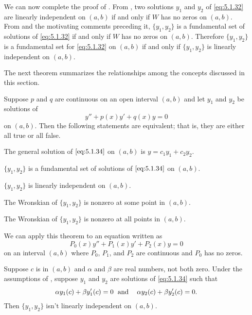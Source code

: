 We can now complete the proof of .
From , two solutions $y_1$ and $y_2$ of
\eqref{eq:5.1.32} are linearly
independent on  $(a,b)$ if and only if $W$ has no zeros on  $(a,b)$.
From  and the motivating comments preceding
it,  $\{y_1,y_2\}$ is  a fundamental set of solutions of
\eqref{eq:5.1.32}  if and only if $W$ has no zeros on  $(a,b)$.
Therefore  $\{y_1,y_2\}$ is   a fundamental set
for \eqref{eq:5.1.32} on  $(a,b)$ if and only if  $\{y_1,y_2\}$
is linearly independent on $(a,b)$. \hfill\qedsymbol

The next theorem summarizes the relationships among the
concepts discussed in this section.

\begin{theorem}\label{thmtype:5.1.6}
 Suppose  $p$ and $q$ are continuous on an open interval $(a,b)$
and  let $y_1$ and $y_2$ be solutions of
\begin{equation}\label{eq:5.1.34}
y''+p(x)y'+q(x)y=0
\end{equation}
on  $(a,b)$.  Then the following statements are equivalent; that
is, they are either all true or all false.
\begin{alist}
\item %
The general solution of $\eqref{eq:5.1.34}$ on  $(a,b)$ is
$y=c_1y_1+c_2y_2$.
\item %
 $\{y_1,y_2\}$ is a fundamental set of solutions of $\eqref{eq:5.1.34}$
on  $(a,b)$.
\item %
 $\{y_1,y_2\}$ is linearly independent on  $(a,b)$.
\item %
The Wronskian of   $\{y_1,y_2\}$ is nonzero at some point in  $(a,b)$.
\item %
The Wronskian of   $\{y_1,y_2\}$ is nonzero at all points in  $(a,b)$.
\end{alist}
\end{theorem}

We can apply this theorem to an equation written as
\[
P_0(x)y''+P_1(x)y'+P_2(x)y=0
\]
on an interval $(a,b)$ where $P_0$, $P_1$, and $P_2$
are continuous and $P_0$ has no zeros.


\begin{theorem}\label{thmtype:5.1.7}
Suppose  $c$ is in $(a,b)$ and $\alpha$ and $\beta$  are real numbers,
not both zero.
Under the assumptions of , suppose
$y_{1}$ and $y_{2}$ are  solutions  of \eqref{eq:5.1.34}   such that
\begin{equation} \label{eq:5.1.35}
\alpha y_{1}(c)+\beta y_{1}'(c)=0\text{\;    and\; \;  }
\alpha y_{2}(c)+\beta y_{2}'(c)=0.
\end{equation}
Then $\{y_{1},y_{2}\}$ isn't  linearly independent on $(a,b)$.
\end{theorem}


